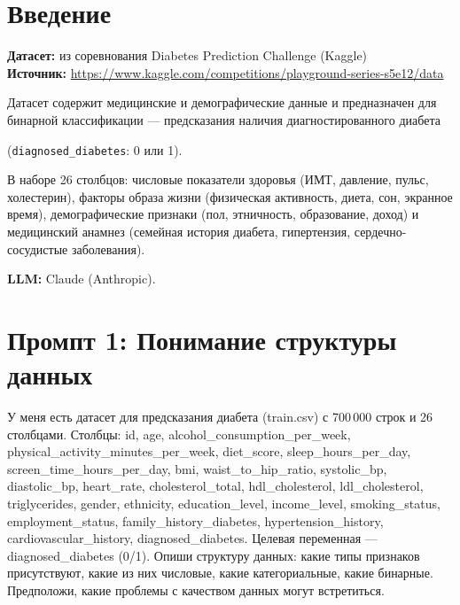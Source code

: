 \documentclass[12pt, a4paper]{article}
\begin{document}
\section{Введение}

\textbf{Датасет:} из соревнования Diabetes Prediction Challenge (Kaggle)\\
\textbf{Источник:} \url{https://www.kaggle.com/competitions/playground-series-s5e12/data}

Датасет содержит медицинские и демографические данные и предназначен для бинарной классификации --- предсказания наличия диагностированного диабета \

(\texttt{diagnosed\_diabetes}: 0 или 1). 

В наборе 26 столбцов: числовые показатели здоровья (ИМТ, давление, пульс, холестерин), 
факторы образа жизни (физическая активность, диета, сон, экранное время), 
демографические признаки (пол, этничность, образование, доход) и медицинский анамнез 
(семейная история диабета, гипертензия, сердечно-сосудистые заболевания).

\textbf{LLM:} Claude (Anthropic).

\section{Промпт 1: Понимание структуры данных}

\begin{promptbox}
У меня есть датасет для предсказания диабета (train.csv) с 700\,000 строк и 26 столбцами. Столбцы: id, age, alcohol\_consumption\_per\_week, physical\_activity\_minutes\_per\_week, diet\_score, sleep\_hours\_per\_day, screen\_time\_hours\_per\_day, bmi, waist\_to\_hip\_ratio, systolic\_bp, diastolic\_bp, heart\_rate, cholesterol\_total, hdl\_cholesterol, ldl\_cholesterol, triglycerides, gender, ethnicity, education\_level, income\_level, smoking\_status, employment\_status, family\_history\_diabetes, hypertension\_history, cardiovascular\_history, diagnosed\_diabetes. Целевая переменная --- diagnosed\_diabetes (0/1). Опиши структуру данных: какие типы признаков присутствуют, какие из них числовые, какие категориальные, какие бинарные. Предположи, какие проблемы с качеством данных могут встретиться.
\end{promptbox}
\end{document}
